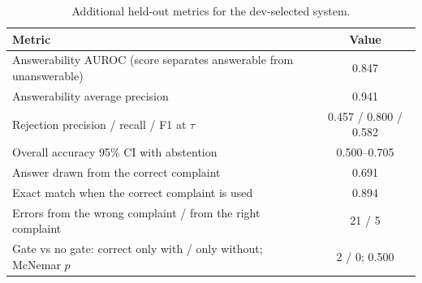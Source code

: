 \begin{table}[H]
\centering
\footnotesize
\caption{Additional held-out metrics for the dev-selected system.}
\label{tab:qaextra}
\begin{tabular}{p{9.6cm}c}
\toprule
Metric & Value \\
\midrule
Answerability AUROC (score separates answerable from unanswerable) & 0.847 \\
Answerability average precision & 0.941 \\
Rejection precision / recall / F1 at $\tau$ & 0.457 / 0.800 / 0.582 \\
Overall accuracy 95\% CI with abstention & 0.500--0.705 \\
Answer drawn from the correct complaint & 0.691 \\
Exact match when the correct complaint is used & 0.894 \\
Errors from the wrong complaint / from the right complaint & 21 / 5 \\
Gate vs no gate: correct only with / only without; McNemar $p$ & 2 / 0; 0.500 \\
\bottomrule
\end{tabular}
\end{table}
